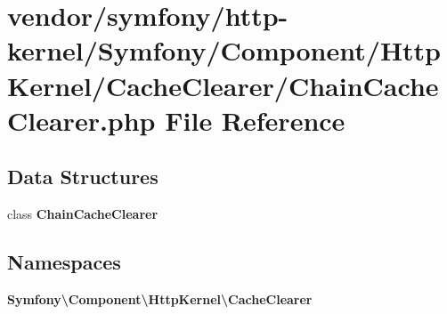 \section{vendor/symfony/http-\/kernel/\+Symfony/\+Component/\+Http\+Kernel/\+Cache\+Clearer/\+Chain\+Cache\+Clearer.php File Reference}
\label{_chain_cache_clearer_8php}
\subsection*{Data Structures}
\begin{DoxyCompactItemize}
\item 
class {\bf Chain\+Cache\+Clearer}
\end{DoxyCompactItemize}
\subsection*{Namespaces}
\begin{DoxyCompactItemize}
\item 
 {\bf Symfony\textbackslash{}\+Component\textbackslash{}\+Http\+Kernel\textbackslash{}\+Cache\+Clearer}
\end{DoxyCompactItemize}
